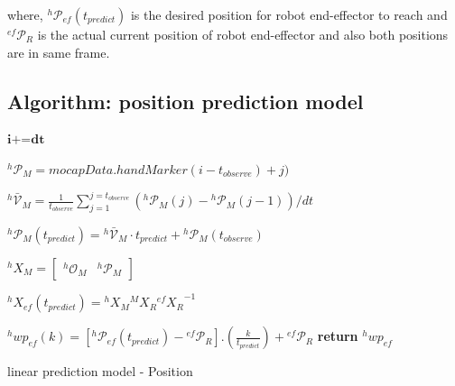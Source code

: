 \documentclass[a4paper, 12pt, oneside]{Thesis}  %
\begin{document}
where, ${}^{h}\mathcal{P}_{ef}(t_{predict})$ is the desired position for robot end-effector to reach and ${}^{ef}\mathcal{P}_{R}$ is the actual current position of robot end-effector and also both positions are in same frame.

\subsection{Algorithm: position prediction model}

\begin{algorithm}[H] \label{positionalgo}
	\DontPrintSemicolon
	\SetNoFillComment
	
	
	
	\textit{$\textbf{i+=dt}$} 
	
	{
		{
			${}^{h}\mathcal{P}_M= \textit{mocapData}.handMarker(i-t_{observe})+j)$	
		}
		
		${}^{h}\mathcal{\bar{V}}_{M} = \frac{1}{t_{observe}}{\sum_{j=1}^{j=t_{observe}} ({}^{h}\mathcal{P}_{M}(j)-{}^{h}\mathcal{P}_{M}(j-1))/dt }$\newline 
		
		${}^{h}\mathcal{P}_M(t_{predict}) = {}^{h}\mathcal{\bar{V}}_{M} \cdot t_{predict}  + {}^{h}\mathcal{P}_{M}(t_{observe})$ %
		
		
		${}^{h}{X}_M= \begin{bmatrix} {}^{h}\mathcal{O}_{M} &  {}^{h}\mathcal{P}_M	\end{bmatrix}$ \newline
		
		${}^{h}{X}_{ef}(t_{predict}) =  {}^{h}{X}_M  {}^{M}{X}_R {{}^{ef}{X}_R}^{-1}$ \newline
		
		
		{
			{
				${}^{h}wp_{ef}(k) = [{}^{h}\mathcal{P}_{ef}(t_{predict}) - {}^{ef}\mathcal{P}_{R}] . (\frac{k}{t_{predict}})  + {}^{ef}\mathcal{P}_{R} $ 
			}	
			\textbf{return} $ {}^{h}wp_{ef} $
		}
	}
	\caption{linear prediction model - Position}
\end{algorithm}
\end{document}
